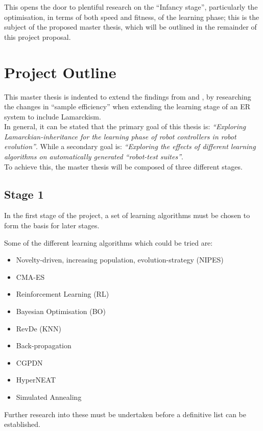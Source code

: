 \documentclass{scrartcl}
\begin{document}
This opens the door to plentiful research on the ``Infancy stage'', particularly the optimisation, in terms of both speed and fitness, of the learning phase; this is the subject of the proposed master thesis, which will be outlined in the remainder of this project proposal.

\section{Project Outline}
This master thesis is indented to extend the findings from \cite{Luo2022} and \cite{Diggelen2022}, by researching the changes in ``sample efficiency'' when extending the learning stage of an ER system to include Lamarckism.\\

In general, it can be stated that the primary goal of this thesis is: \textit{``Exploring Lamarckian-inheritance for the learning phase of robot controllers in robot evolution''}.
While a secondary goal is: \textit{``Exploring the effects of different learning algorithms on automatically generated ``robot-test suites''}. \\

To achieve this, the master thesis will be composed of three different stages.

\subsection{Stage 1}
In the first stage of the project, a set of learning algorithms must be chosen to form the basis for later stages.

Some of the different learning algorithms which could be tried are:

\begin{itemize}
    \item Novelty-driven, increasing population, evolution-strategy (NIPES)
    \item CMA-ES
    \item Reinforcement Learning (RL)
    \item Bayesian Optimisation (BO)
    \item RevDe (KNN)
    \item Back-propagation
    \item CGPDN
    \item HyperNEAT
    \item Simulated Annealing
\end{itemize}

Further research into these must be undertaken before a definitive list can be established. \\
\end{document}
